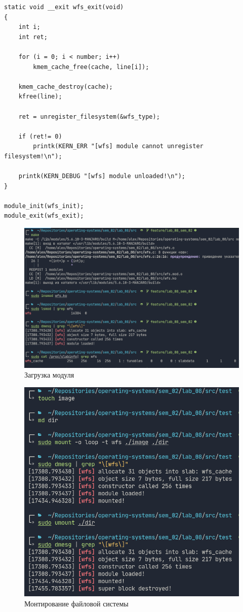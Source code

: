 \begin{lstlisting}[caption=Текст программы]
static void __exit wfs_exit(void)
{
    int i;
    int ret;

    for (i = 0; i < number; i++)
        kmem_cache_free(cache, line[i]);

    kmem_cache_destroy(cache);
    kfree(line);

    ret = unregister_filesystem(&wfs_type);

    if (ret!= 0)
        printk(KERN_ERR "[wfs] module cannot unregister filesystem!\n");

    printk(KERN_DEBUG "[wfs] module unloaded!\n");
}

module_init(wfs_init);
module_exit(wfs_exit);
\end{lstlisting}

\begin{figure}[H]
    \centering
    \includegraphics[scale=0.4]{img/insmod.png}
    \caption{Загрузка модуля}
\end{figure}

\begin{figure}[H]
    \centering
    \includegraphics[scale=0.45]{img/mount.png}
    \caption{Монтирование файловой системы}
\end{figure}


